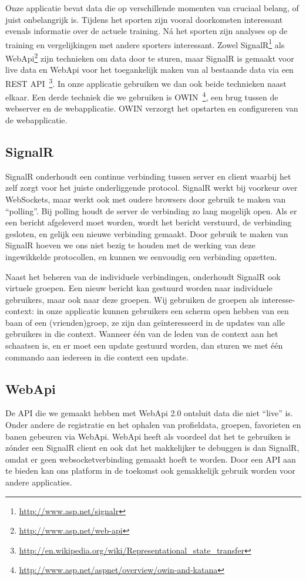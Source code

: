 Onze applicatie bevat data die op verschillende momenten van cruciaal belang, of juist onbelangrijk is. Tijdens het sporten zijn vooral doorkomsten interessant evenals informatie over de actuele training. Ná het sporten zijn analyses op de training en vergelijkingen met andere sporters interessant. Zowel SignalR\footnote{\url{http://www.asp.net/signalr}} als WebApi\footnote{\url{http://www.asp.net/web-api}} zijn technieken om data door te sturen, maar SignalR is gemaakt voor live data en WebApi voor het toegankelijk maken van al bestaande data via een REST API~\footnote{\url{http://en.wikipedia.org/wiki/Representational_state_transfer}}. In onze applicatie gebruiken we dan ook beide technieken naast elkaar. Een derde techniek die we gebruiken is OWIN~\footnote{\url{http://www.asp.net/aspnet/overview/owin-and-katana}}, een brug tussen de webserver en de webapplicatie. OWIN verzorgt het opstarten en configureren van de webapplicatie.

\subsection{SignalR}
SignalR onderhoudt een continue verbinding tussen server en client waarbij het zelf zorgt voor het juiste onderliggende protocol. SignalR werkt bij voorkeur over WebSockets, maar werkt ook met oudere browsers door gebruik te maken van ``polling''. Bij polling houdt de server de verbinding zo lang mogelijk open. Als er een bericht afgeleverd moet worden, wordt het bericht verstuurd, de verbinding gesloten, en gelijk een nieuwe verbinding gemaakt. Door gebruik te maken van SignalR hoeven we ons niet bezig te houden met de werking van deze ingewikkelde protocollen, en kunnen we eenvoudig een verbinding opzetten.

Naast het beheren van de individuele verbindingen, onderhoudt SignalR ook virtuele groepen. Een nieuw bericht kan gestuurd worden naar individuele gebruikers, maar ook naar deze groepen. Wij gebruiken de groepen als interesse-context: in onze applicatie kunnen gebruikers een scherm open hebben van een baan of een (vrienden)groep, ze zijn dan geïnteresseerd in de updates van alle gebruikers in die context. Wanneer één van de leden van de context aan het schaatsen is, en er moet een update gestuurd worden, dan sturen we met één commando aan iedereen in die context een update.

\subsection{WebApi}
De API die we gemaakt hebben met WebApi 2.0 ontsluit data die niet ``live'' is. Onder andere de registratie en het ophalen van profieldata, groepen, favorieten en banen gebeuren via WebApi. WebApi heeft als voordeel dat het te gebruiken is zónder een SignalR client en ook dat het makkelijker te debuggen is dan SignalR, omdat er geen  websocketverbinding gemaakt hoeft te worden. Door een API aan te bieden kan ons platform in de toekomst ook gemakkelijk gebruik worden voor andere applicaties.


